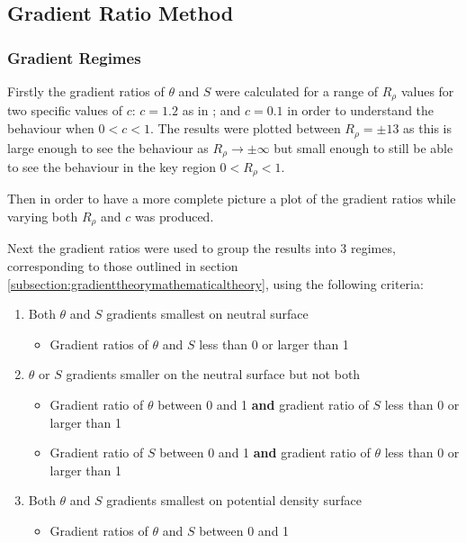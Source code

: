 \subsection{Gradient Ratio Method}
\label{subsection:gradientmethod}

\subsubsection{Gradient Regimes}

Firstly the gradient ratios of $\theta$ and $S$ were calculated for a range of $R_\rho$ values for two specific values of $c$: $c = 1.2$ as in \citet{McDougall1987}; and $c = 0.1$ in order to understand the behaviour when $0<c<1$. The results were plotted between $R_\rho = \pm 13$ as this is large enough to see the behaviour as $R_\rho \to \pm \infty$ but small enough to still be able to see the behaviour in the key region $0<R_\rho<1$.

Then in order to have a more complete picture a plot of the gradient ratios while varying both $R_\rho$ and $c$ was produced. 

Next the gradient ratios were used to group the results into 3 regimes, corresponding to those outlined in section \ref{subsection:gradienttheorymathematicaltheory}, using the following criteria: 

\begin{enumerate}
    \item Both $\theta$ and $S$ gradients smallest on neutral surface
        \begin{itemize}
            \item Gradient ratios of $\theta$ and $S$ less than 0 or larger than 1
        \end{itemize}
    \item $\theta$ or $S$ gradients smaller on the neutral surface but not both
         \begin{itemize}
            \item Gradient ratio of $\theta$ between 0 and 1 \textbf{and} gradient ratio of $S$ less than 0 or larger than 1
            \item Gradient ratio of $S$ between 0 and 1 \textbf{and} gradient ratio of $\theta$ less than 0 or larger than 1
        \end{itemize}
    \item Both $\theta$ and $S$ gradients smallest on potential density surface
         \begin{itemize}
            \item Gradient ratios of $\theta$ and $S$ between 0 and 1
        \end{itemize}
\end{enumerate}

